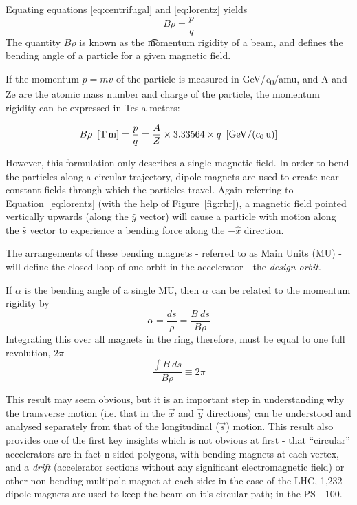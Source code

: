 \documentclass[11pt]{report}
\begin{document}
Equating equations \ref{eq:centrifugal} and \ref{eq:lorentz} yields
\begin{equation}
B\rho=\frac pq
\end{equation}
The quantity $B\rho$ is known as the {\t momentum rigidity} of a beam, and defines the bending angle of a particle for a given magnetic field. 

If the momentum $p=mv$ of the particle is measured in \unit[per-mode = symbol]{\GeV\per\clight\per amu}, and A and Ze are the atomic mass number and charge of the particle, the momentum rigidity can be expressed in Tesla-meters:

\begin{equation}
B\rho\ \left[\unit{\tesla\meter}\right]=\frac pq=\frac AZ\times3.33564\times q\ \left[\unit[per-mode=symbol]{\GeV\per\clight\per\atomicmassunit}\right]
\end{equation}

However, this formulation only describes a single magnetic field. In order to bend the particles along a circular trajectory, dipole magnets are used to create near-constant fields through which the particles travel. Again referring to Equation~\ref{eq:lorentz} (with the help of Figure~\ref{fig:rhr}), a magnetic field pointed vertically upwards (along the $\hat y$ vector) will cause a particle with motion along the $\hat s$ vector to experience a bending force along the $-\hat x$ direction.

The arrangements of these bending magnets - referred to as Main Units (MU) - will define the closed loop of one orbit in the accelerator - the {\it design orbit}.

If $\alpha$ is the bending angle of a single MU, then $\alpha$ can be related to the momentum rigidity by
\begin{equation}
\alpha=\frac{ds}\rho=\frac{B\ ds}{B\rho}
\end{equation}
Integrating this over all magnets in the ring, therefore, must be equal to one full revolution, $2\pi$
\begin{equation}
\frac{\int B\ ds}{B\rho}\equiv2\pi
\end{equation}

This result may seem obvious, but it is an important step in understanding why the transverse motion (i.e. that in the $\vec x$ and $\vec y$ directions) can be understood and analysed separately from that of the longitudinal ($\vec s$) motion. This result also provides one of the first key insights which is not obvious at first - that ``circular'' accelerators are in fact n-sided polygons, with bending magnets at each vertex, and a {\it drift} (accelerator sections without any significant electromagnetic field) or other non-bending multipole magnet at each side: in the case of the LHC, 1,232 dipole magnets are used to keep the beam on it's circular path; in the PS - 100. 
\end{document}
